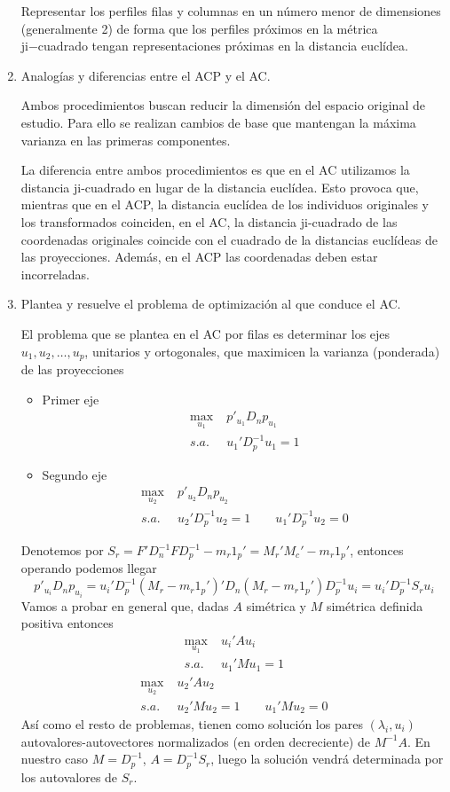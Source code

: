 \documentclass[twoside]{article}
\begin{document}
\begin{enumerate}
Representar los perfiles filas y columnas en un número menor
de dimensiones (generalmente 2) de forma que los perfiles próximos en la métrica ji−cuadrado tengan representaciones próximas en la distancia euclídea.


\item Analogías y diferencias entre el ACP y el AC.

Ambos procedimientos buscan reducir la dimensión del espacio original de estudio. Para ello se realizan cambios de base que mantengan la máxima varianza en las primeras componentes.  

La diferencia entre ambos procedimientos es que en el AC utilizamos la distancia ji-cuadrado en lugar de la distancia euclídea. Esto provoca que, mientras que en el ACP, la distancia euclídea de los individuos originales y los transformados coinciden, en el AC, la distancia ji-cuadrado de las coordenadas originales coincide con el cuadrado de la distancias euclídeas de las proyecciones. Además, en el ACP las coordenadas deben estar incorreladas. 

\item Plantea y resuelve el problema de optimización al que conduce el AC. 

El problema que se plantea en el AC por filas es determinar los ejes $u_1, u_2,\dotsc, u_p$, unitarios y ortogonales, que maximicen la varianza (ponderada) de las proyecciones
\begin{itemize}
\item Primer eje
\begin{align*}
\max_{u_1} &\; p'_{u_1}D_np_{u_1} \\
s.a.&\; u_1'D_p^{-1}u_1 = 1
\end{align*}
\item Segundo eje
\begin{align*}
\max_{u_2} &\; p'_{u_2}D_n p_{u_2} \\
s.a.& \;u_2'D_p^{-1}u_2 = 1 \qquad u_1'D_p^{-1}u_2 = 0 
\end{align*}
\end{itemize}

Denotemos por $S_r = F'D_n^{-1}FD_p^{-1}-m_r1_p' = M_r'M_c'-m_r1_p'$, entonces operando podemos llegar
$$
p'_{u_i}D_np_{u_i} = u_i'D_p^{-1}(M_r -m_r1_p')'D_n(M_r -m_r1_p')D_p^{-1}u_i = u_i'D_p^{-1}S_ru_i
$$
Vamos a probar en general que, dadas $A$ simétrica y $M$ simétrica definida positiva entonces
\begin{align*}
\max_{u_1} &\;  u_i'Au_i \\
s.a.&\;  u_1'Mu_1 = 1
\end{align*}
\begin{align*}
\max_{u_2} &\;  u_2'Au_2 \\
s.a.& \; u_2'Mu_2 = 1 \qquad u_1'Mu_2 = 0 
\end{align*}
Así como el resto de problemas, tienen como solución los pares $(\lambda_i,u_i)$ autovalores-autovectores normalizados (en orden decreciente) de $M^{-1}A$. En nuestro caso $M=D_p^{-1}$, $A = D^{-1}_p S_r$, luego la solución vendrá determinada por los autovalores de $S_r$.


\end{enumerate}
\end{document}
